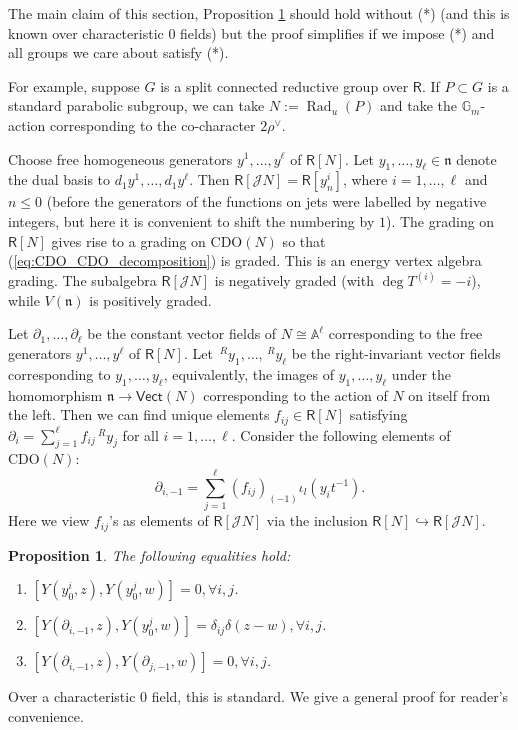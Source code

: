 \documentclass{amsart}
\newtheorem{Prop}[Thm]{Proposition}
\theoremstyle{definition}
\newcommand{\Ring}{\mathsf{R}}
\newcommand{\Jet}{\mathscr{J}}
\newcommand{\CDO}{\mathrm{CDO}}
\numberwithin{equation}{section}
\begin{document}
The main claim of this section, Proposition \ref{CDO_prop_nilpotent} should hold without (*) (and this is known over characteristic $0$ fields) but the proof simplifies if we impose (*) and all groups we care about satisfy (*).

For example, suppose $G$ is a split connected reductive group over $\Ring$.  If $P \subset G$ is a standard parabolic subgroup, we can take $N:= \operatorname{Rad}_u(P)$ and take the $\mathbb{G}_m$-action corresponding to the co-character $2\rho^\vee$. 

Choose free homogeneous generators $y^1,\ldots,y^\ell$ of $\Ring[N]$. Let $y_1,\ldots,y_\ell\in \mathfrak{n}$ denote the dual basis to $d_1y^1,\ldots, d_1y^\ell$.
Then $\Ring[\Jet N]=\Ring[y^i_n]$, where $i=1,\ldots,\ell$ and $n\leqslant 0$ (before the generators of the functions on jets were labelled by negative integers, but here it is convenient to shift the numbering by $1$). The grading on $\Ring[N]$ gives rise to a grading on $\CDO(N)$
so that (\ref{eq:CDO_CDO_decomposition}) is graded. This is an energy vertex algebra grading.  
The subalgebra  $\Ring[\Jet N]$ is negatively graded (with $\operatorname{deg}T^{(i)}=-i$), while $V(\mathfrak{n})$ is positively graded. 

Let $\partial_1,\ldots, \partial_\ell$ be the constant vector fields of $N\cong \mathbb{A}^\ell$ corresponding to the free generators $y^1,\ldots,y^\ell$ of $\Ring[N]$. Let $\,^Ry_1,\ldots,\,^Ry_\ell$ be the right-invariant vector fields corresponding to $y_1,\ldots,y_\ell$, equivalently, the images of $y_1,\ldots,y_\ell$ under the homomorphism $\mathfrak{n}\rightarrow \mathsf{Vect}(N)$ corresponding to the action of $N$ on itself from the left. Then we can find unique elements $f_{ij}\in \Ring[N]$ satisfying 
$\partial_i=\sum_{j=1}^\ell f_{ij}\,^Ry_j$ for all $i=1,\ldots,\ell$. Consider the following elements of $\CDO(N)$:
\begin{equation}\label{eq:CDO_const_vect_vertex}
\partial_{i,-1}=\sum_{j=1}^\ell (f_{ij})_{(-1)}\iota_l(y_it^{-1}).
\end{equation}
Here we view $f_{ij}$'s as elements of $\Ring[\Jet N]$ via the inclusion $\Ring[N]\hookrightarrow \Ring[\Jet N]$. 

\begin{Prop}\label{CDO_prop_nilpotent}
The following equalities hold:
\begin{enumerate}
    \item $[Y(y^i_0, z), Y(y^j_0, w)] = 0, \forall i,j$.
    \item $[Y(\partial_{i,-1}, z), Y(y^j_0, w)] = \delta_{ij} \delta(z-w), \forall i,j$.
    \item $[Y(\partial_{i,-1}, z), Y(\partial_{j,-1}, w)] = 0,  \forall i,j$. 
\end{enumerate}
\end{Prop}
Over a characteristic $0$ field, this is standard. We give a general proof for reader's convenience. 
\end{document}

